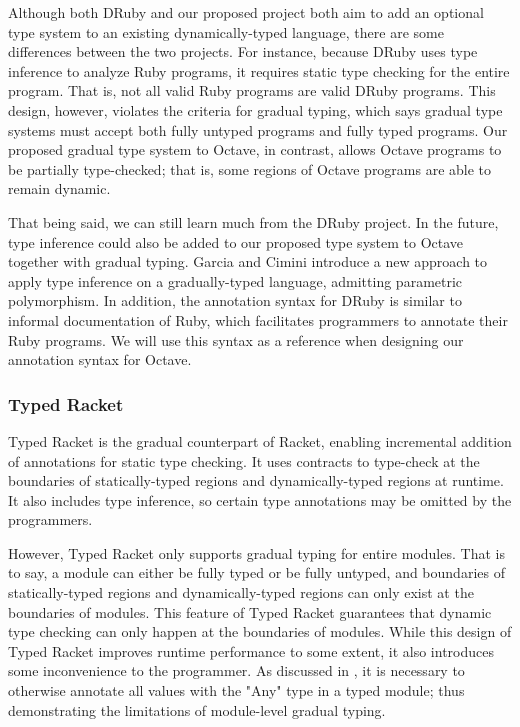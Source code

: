 Although both DRuby and our proposed project both aim to add an optional type system to an existing dynamically-typed language, there are some differences between the two projects. For instance, because DRuby uses type inference to analyze Ruby programs, it requires static type checking for the entire program. That is, not all valid Ruby programs are valid DRuby programs. This design, however, violates the criteria for gradual typing, which says gradual type systems must accept both fully untyped programs and fully typed programs. Our proposed gradual type system to Octave, in contrast, allows Octave programs to be partially type-checked; that is, some regions of Octave programs are able to remain dynamic.

That being said, we can still learn much from the DRuby project. In the future, type inference could also be added to our proposed type system to Octave together with gradual typing. Garcia and Cimini \cite{garcia2015principal} introduce a new approach to apply type inference on a gradually-typed language, admitting parametric polymorphism. In addition, the annotation syntax for DRuby is similar to informal documentation of Ruby, which facilitates programmers to annotate their Ruby programs. We will use this syntax as a reference when designing our annotation syntax for Octave.

\subsubsection{Typed Racket}
Typed Racket \cite{tobin2006interlanguage} is the gradual counterpart of Racket, enabling incremental addition of annotations for static type checking. It uses contracts to type-check at the boundaries of statically-typed regions and dynamically-typed regions at runtime. It also includes type inference, so certain type annotations may be omitted by the programmers.

However, Typed Racket only supports gradual typing for entire modules. That is to say, a module can either be fully typed or be fully untyped, and boundaries of statically-typed regions and dynamically-typed regions can only exist at the boundaries of modules. This feature of Typed Racket guarantees that dynamic type checking can only happen at the boundaries of modules. While this design of Typed Racket improves runtime performance to some extent, it also introduces some inconvenience to the programmer. As discussed in \cite{figueroa2012practical}, it is necessary to otherwise annotate all values with the "Any" type in a typed module; thus demonstrating the limitations of module-level gradual typing.

